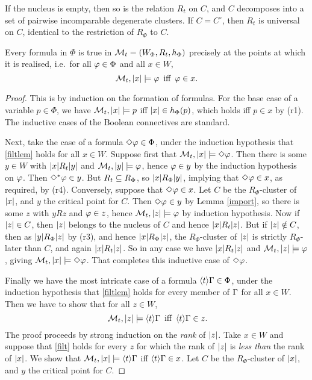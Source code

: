 If the nucleus is empty, then so is the relation $R_t$ on $C$, and $C$ decomposes into a set of pairwise incomparable degenerate clusters. If $C=C^\circ$, then $R_t$ is universal  on $C$, identical to the restriction of $R_\Phi$ to $C$.



\begin{lemma}
Every formula in $\Phi$  is true in $\mathcal{M}_t=(W_\Phi,R_t,h_\Phi)$ precisely at the points at which it is realised, i.e.\ for all $\varphi\in\Phi$ and all $x\in W$,
 \begin{equation}\label{filtlem}
\text{$\M_t,\ab{x}\models \ph$\enspace iff\enspace $\ph\in x$.}
 \end{equation}
\end{lemma}

\begin{proof}
This is by  induction on the  formation of formulas. For the base case of  a variable $p\in\Phi$, we have
$\mathcal{M}_t,|x|\models p$ iff $|x|\in h_\Phi(p)$, which holds iff $p\in x$ by (r1). The inductive cases of the Boolean connectives are standard.

 Next, take the case of a formula $\Diamond\varphi\in\Phi$,  under the induction hypothesis that \eqref{filtlem} holds for all $x\in W$.
 Suppose first that $\mathcal{M}_t,|x|\models \Diamond\varphi$. Then there is some $y\in W$ with $|x|R_t|y|$ and $\mathcal{M}_t,|y|\models \varphi$, hence $\varphi\in y$ by the induction hypothesis on $\varphi$. Then $\Diamond^*\varphi\in y$. But $R_t\subseteq R_\Phi$, so  $|x|R_\Phi|y|$, implying that $\Diamond\varphi\in x$, as required, by  (r4).  Conversely, suppose that $\Diamond\varphi\in x$. Let $C$ be the $R_\Phi$-cluster of $|x|$, and $y$ the critical point for $C$. Then $\Diamond\varphi\in y$ by Lemma \ref{import}, so there is some $z$ with $yRz$ and $\varphi\in z$, hence $\mathcal{M}_t,|z|\models \varphi$ by induction hypothesis. Now if $|z|\in C$, then $|z|$ belongs to the nucleus of $C$ and hence $|x|R_t|z|$. But if $|z|\notin C$, then as $|y|R_\Phi|z|$ by (r3), and hence $|x|R_\Phi|z|$, the $R_\Phi$-cluster of $|z|$ is strictly $R_\Phi$-later than $C$, and again $|x|R_t|z|$. So in any case we have 
 $|x|R_t|z|$ and $\mathcal{M}_t,|z|\models \varphi$, giving $\mathcal{M}_t,|x|\models \Diamond\varphi$. That completes this inductive case of $\Diamond\varphi$.
 
 Finally we have the most intricate case of a   formula $\langle t\rangle\Gamma\in\Phi$, under the induction hypothesis that  \eqref{filtlem} holds for every member of $\Gamma$ for all $x\in W$. Then we have to show that for all $z\in W$, 
\begin{equation}\label{filt}
\text{
$\M_t,\ab{z}\models \Di\G$\enspace iff\enspace $\Di\G\in z$.}
\end{equation}
The proof  proceeds by strong induction on the \emph{rank} of $|z|$.
Take $x\in W$ and suppose that \eqref{filt} holds for every $z$ for which the rank of $|z|$ is  \emph{less than} the rank of $|x|$. We show that
$\mathcal{M}_t,|x|\models \langle t\rangle\Gamma$ iff $\langle t\rangle\Gamma\in x$. Let  $C$ be the $R_\Phi$-cluster of $|x|$, and $y$  the critical point for $C$.


\end{proof}
